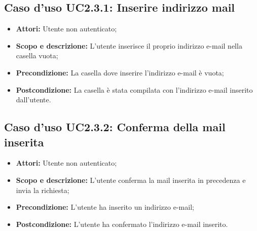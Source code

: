\subsection{Caso d'uso UC2.3.1: Inserire indirizzo mail}
\begin{itemize}
	\item \textbf{Attori:} Utente non autenticato;
	\item \textbf{Scopo e descrizione:} L'utente inserisce il proprio indirizzo e-mail nella casella vuota;
	\item \textbf{Precondizione:} La casella dove inserire l'indirizzo e-mail è vuota;
	\item \textbf{Postcondizione:} La casella è stata compilata con l'indirizzo e-mail inserito dall'utente.
\end{itemize}

\subsection{Caso d'uso UC2.3.2: Conferma della mail inserita}
\begin{itemize}
	\item \textbf{Attori:} Utente non autenticato;
	\item \textbf{Scopo e descrizione:} L'utente conferma la mail inserita in precedenza e invia la richiesta;
	\item \textbf{Precondizione:} L'utente ha inserito un indirizzo e-mail;
	\item \textbf{Postcondizione:} L'utente ha confermato l'indirizzo e-mail inserito.
\end{itemize}
